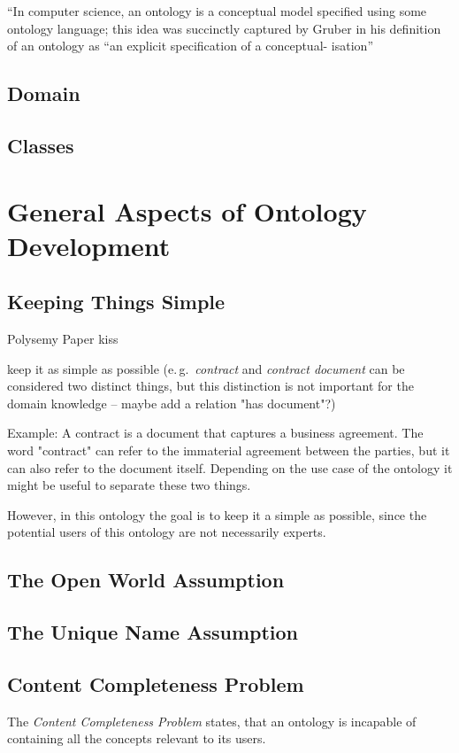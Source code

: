 \documentclass[a4paper, DIV=13, BCOR=0cm]{scrbook}
\newcommand{\eg}{e.\,g.\ }
\begin{document}
\enquote{In computer science, an ontology is a conceptual model specified using some ontology language; this idea was succinctly captured by Gruber in his definition of an ontology as “an explicit specification of a conceptual- isation} \cite{baader2017introduction}

\subsection{Domain}
\subsection{Classes}

\section{General Aspects of Ontology Development}
\label{general-aspects}

\subsection{Keeping Things Simple }
\label{keeping-things-simple}
Polysemy Paper \cite{arapinis2015plea}
\gls{kiss}

keep it as simple as possible (\eg \textit{contract} and \textit{contract document} can be considered two distinct things, but this distinction is not important for the domain knowledge -- maybe add a relation "has document"?)

Example: A contract is a document that captures a business agreement. The word "contract" can refer to the immaterial agreement between the parties, but it can also refer to the document itself. Depending on the use case of the ontology it might be useful to separate these two things.

However, in this ontology the goal is to keep it a simple as possible, since the potential users of this ontology are not necessarily experts.

\subsection{The Open World Assumption}
\subsection{The Unique Name Assumption}
\subsection{Content Completeness Problem}
The \textit{Content Completeness Problem} states, that an ontology is incapable of containing all the concepts relevant to its users. 
\end{document}
